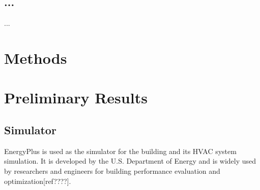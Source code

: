 \documentclass{article}
\begin{document}
\subsection{...}
...

  
 
 
 
  

\section{Methods}

\section{Preliminary Results}
\subsection{Simulator}
EnergyPlus is used as the simulator for the building and its HVAC system simulation. It is developed by the U.S. Department of Energy and is widely used by researchers and engineers for building performance evaluation and optimization[ref????]. 
\end{document}
